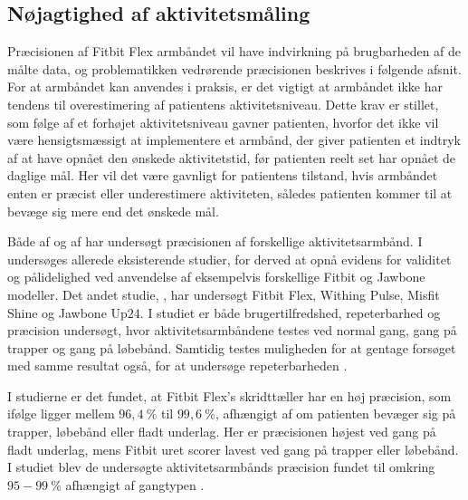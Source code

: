 \subsection{Nøjagtighed af aktivitetsmåling} \label{noejagtighed}

Præcisionen af Fitbit Flex armbåndet vil have indvirkning på brugbarheden af de målte data, og problematikken vedrørende præcisionen beskrives i følgende afsnit. For at armbåndet kan anvendes i praksis, er det vigtigt at armbåndet ikke har tendens til overestimering af patientens aktivitetsniveau. Dette krav er stillet, som følge af et forhøjet aktivitetsniveau gavner patienten, hvorfor det ikke vil være hensigtsmæssigt at implementere et armbånd, der giver patienten et indtryk af at have opnået den ønskede aktivitetstid, før patienten reelt set har opnået de daglige mål. Her vil det være gavnligt for patientens tilstand, hvis armbåndet enten er præcist eller underestimere aktiviteten, således patienten kommer til at bevæge sig mere end det ønskede mål.

Både  af \citeauthor{evenson2015} og  af \citeauthor{kaewkannate2016} har undersøgt præcisionen af forskellige aktivitetsarmbånd. I \citeauthor{evenson2015} undersøges allerede eksisterende studier, for derved at opnå evidens for validitet og pålidelighed ved anvendelse af eksempelvis forskellige Fitbit og Jawbone modeller. Det andet studie, \citeauthor{kaewkannate2016}, har undersøgt Fitbit Flex, Withing Pulse, Misfit Shine og Jawbone Up$24$. I studiet er både brugertilfredshed, repeterbarhed og præcision undersøgt, hvor aktivitetsarmbåndene testes ved normal gang, gang på trapper og gang på løbebånd. Samtidig testes muligheden for at gentage forsøget med samme resultat også, for at undersøge repeterbarheden \citep{evenson2015, kaewkannate2016}.

I studierne er det fundet, at Fitbit Flex's skridttæller har en høj præcision, som ifølge \citeauthor{kaewkannate2016} ligger mellem $96,4~\%$ til $99,6~\%$, afhængigt af om patienten bevæger sig på trapper, løbebånd eller fladt underlag. Her er præcisionen højest ved gang på fladt underlag, mens Fitbit uret scorer lavest ved gang på trapper eller løbebånd. I studiet blev de undersøgte aktivitetsarmbånds præcision fundet til omkring $95-99~\%$ afhængigt af gangtypen \citep{kaewkannate2016}.

